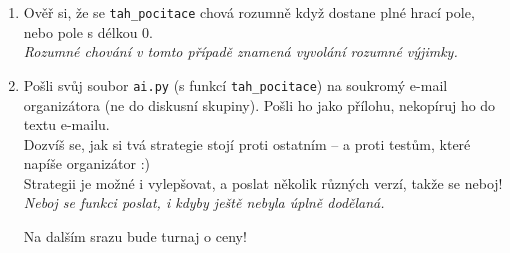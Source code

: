 \documentclass[a4paper,10pt]{article}
\begin{document}
\begin{enumerate}
\item Ověř si, že se \texttt{tah\_pocitace} chová rozumně když dostane plné hrací pole, nebo pole s délkou 0.
    \\\emph{\small Rozumné chování v tomto případě znamená vyvolání rozumné výjimky.}

\item Pošli svůj soubor \texttt{ai.py} (s funkcí \texttt{tah\_pocitace})
    na soukromý e-mail organizátora (ne do diskusní skupiny).
    Pošli ho jako přílohu, nekopíruj ho do textu e-mailu.
    \\Dozvíš se, jak si tvá strategie stojí proti ostatním – a proti testům, které napíše organizátor :)
    \\Strategii je možné i vylepšovat, a poslat několik různých verzí, takže se neboj!
    \\\emph{\small Neboj se funkci poslat, i kdyby ještě nebyla úplně dodělaná.}

    Na dalším srazu bude turnaj o ceny!

\end{enumerate}
\end{document}
